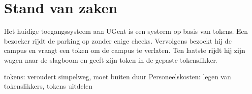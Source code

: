 \chapter{Stand van zaken}
\label{ch:stand-van-zaken}






Het huidige toegangssysteem aan UGent is een systeem op basis van tokens. Een bezoeker rijdt de parking op zonder enige checks. Vervolgens bezoekt hij de campus en vraagt een token om de campus te verlaten. Ten laatste rijdt hij zijn wagen naar de slagboom en geeft zijn token in de gepaste tokenslikker.

tokens: 
	veroudert simpelweg, moet buiten
	duur
	Personeelskosten: legen van tokenslikkers, tokens uitdelen

